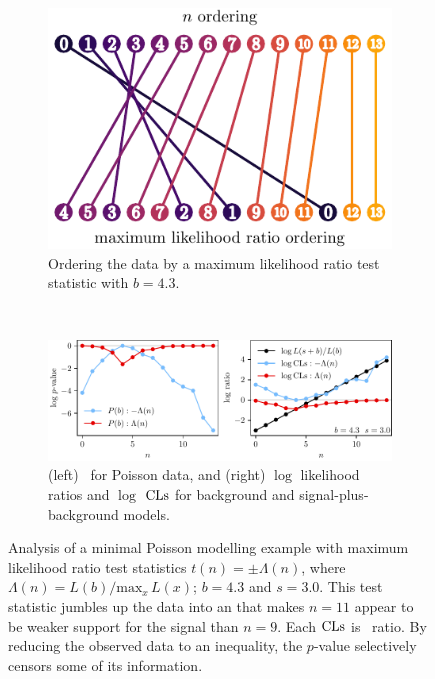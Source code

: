 \begin{figure}[tp]
\centering
\begin{subfigure}{0.5\textwidth}
\centering
\includegraphics[width=\textwidth]{figures/searches_cls_plots_with_pvals_order.pdf}
\caption{%
Ordering the data by a maximum likelihood ratio test statistic with $b=4.3$.
}
\end{subfigure}
\\[.5em]
\begin{subfigure}{\textwidth}
\centering
\includegraphics[width=\textwidth]{figures/searches_cls_plots_with_pvals_t.pdf}
\caption{%
(left) \pvalues\ for Poisson data,
and (right) $\log$ likelihood ratios and $\log$ $\mathrm{CLs}$ for
background and signal-plus-background models.%
}
\end{subfigure}
\caption[
Analysis of a minimal Poisson modelling example with maximum likelihood ratio
test statistics
]{%
Analysis of a minimal Poisson modelling example with maximum likelihood ratio
test statistics $t(n) = \pm \Lambda(n)$,
where $\Lambda(n) = L(b)/\mathrm{max}_x\,L(x)$; $b = 4.3$ and $s = 3.0$.
This test statistic jumbles up the data into an that makes $n=11$ appear to be
weaker support for the signal than $n=9$.
Each $\mathrm{CLs}$ is \pvalue\ ratio.
By reducing the observed data to an inequality, the $p$-value selectively
censors some of its information.
}
\label{fig:searches_sb_t}
\end{figure}

